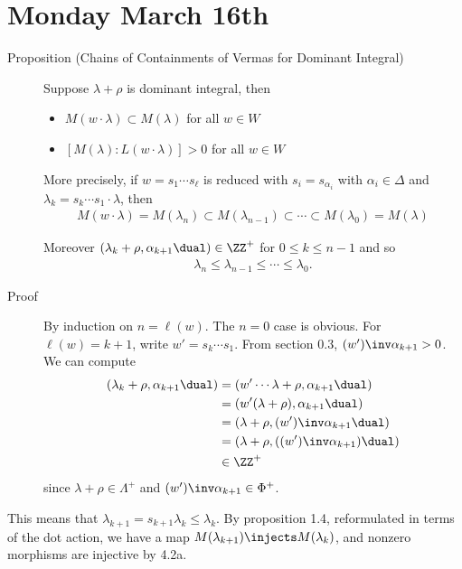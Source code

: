 \hypertarget{monday-march-16th}{%
\section{Monday March 16th}\label{monday-march-16th}}

\begin{description}
\item[Proposition (Chains of Containments of Vermas for Dominant
Integral)]
Suppose \(\lambda + \rho\) is dominant integral, then

\begin{itemize}
\tightlist
\item
  \(M(w\cdot \lambda) \subset M(\lambda)\) for all \(w\in W\)
\item
  \([M(\lambda): L(w\cdot \lambda)] > 0\) for all \(w\in W\)
\end{itemize}

More precisely, if \(w = s_1 \cdots s_\ell\) is reduced with
\(s_i = s_{\alpha_i}\) with \(\alpha_i \in \Delta\) and
\(\lambda_k = s_k \cdots s_1 \cdot \lambda\), then
\begin{align*}
M(w\cdot \lambda) = M(\lambda_n) \subset M(\lambda_{n-1}) \subset \cdots \subset M(\lambda_0) = M(\lambda)
\end{align*}

Moreover \((\lambda_k + \rho, \alpha_{k+1}\dual) \in \ZZ^+\) for
\(0\leq k \leq n-1\) and so
\begin{align*}
\lambda_n \leq \lambda_{n-1} \leq \cdots \leq \lambda_0
.\end{align*}
\item[Proof]
By induction on \(n = \ell(w)\). The \(n=0\) case is obvious. For
\(\ell(w) = k+1\), write \(w'= s_k \cdots s_1\). From section 0.3,
\((w')\inv \alpha_{k+1} > 0\). We can compute \begin{align*}
  (\lambda_k + \rho, \alpha_{k+1}\dual)
  &= (w' \cdots \lambda + \rho, \alpha_{k+1}\dual) \\
  &= (w'(\lambda + \rho), \alpha_{k+1}\dual) \\
  &= (\lambda + \rho, (w')\inv \alpha_{k+1}\dual) \\
  &= (\lambda + \rho, ((w')\inv \alpha_{k+1})\dual) \\
  &\in \ZZ^{+}
  \end{align*} since \(\lambda + \rho \in \Lambda^+\) and
\((w')\inv \alpha_{k+1} \in \Phi^+\).
\end{description}

This means that \(\lambda_{k+1} = s_{k+1} \lambda_k \leq \lambda_k\). By
proposition 1.4, reformulated in terms of the dot action, we have a map
\(M(\lambda_{k+1}) \injects M(\lambda_k)\), and nonzero morphisms are
injective by 4.2a.


